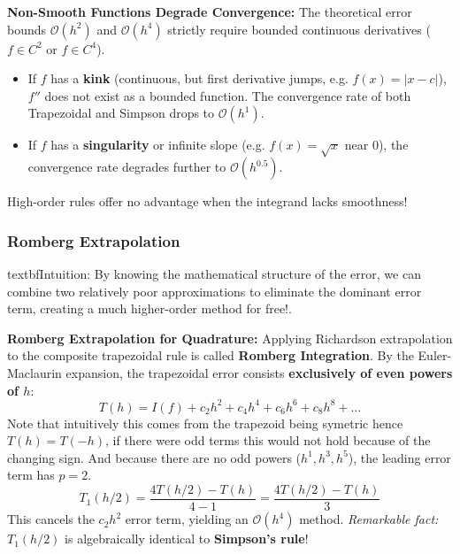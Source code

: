 \begin{remark}
    \textbf{Non-Smooth Functions Degrade Convergence:} The theoretical error bounds $\mathcal{O}(h^2)$ and $\mathcal{O}(h^4)$ strictly require bounded continuous derivatives ($f \in C^2$ or $f \in C^4$).
    \begin{itemize}
        \item If $f$ has a \textbf{kink} (continuous, but first derivative jumps, e.g. $f(x) = |x - c|$), $f''$ does not exist as a bounded function. The convergence rate of both Trapezoidal and Simpson drops to $\mathcal{O}(h^1)$.
        \item If $f$ has a \textbf{singularity} or infinite slope (e.g. $f(x) = \sqrt{x}$ near 0), the convergence rate degrades further to $\mathcal{O}(h^{0.5})$.
    \end{itemize}
    High-order rules offer no advantage when the integrand lacks smoothness!
\end{remark}


\subsubsection{Romberg Extrapolation}

\begin{remark}
    textbf{Intuition:} By knowing the mathematical structure of the error, we can combine two relatively poor approximations to eliminate the dominant error term, creating a much higher-order method for free!.
\end{remark}

\begin{definition}
    \textbf{Romberg Extrapolation for Quadrature:} Applying Richardson extrapolation to the composite trapezoidal rule is called \textbf{Romberg Integration}.
    By the Euler-Maclaurin expansion, the trapezoidal error consists \textbf{exclusively of even powers of $h$}:
    $$T(h) = I(f) + c_2 h^2 + c_4 h^4 + c_6 h^6 + c_8 h^8 + \dots$$
    Note that intuitively this comes from the trapezoid being symetric hence $T(h) = T(-h)$, if there were odd terms this would not hold because of the changing sign.
    And because there are no odd powers ($h^1, h^3, h^5$), the leading error term has $p = 2$.
    $$T_1(h/2) = \frac{4 T(h/2) - T(h)}{4 - 1} = \frac{4 T(h/2) - T(h)}{3}$$
    This cancels the $c_2 h^2$ error term, yielding an $\mathcal{O}(h^4)$ method.
    \emph{Remarkable fact:} $T_1(h/2)$ is algebraically identical to \textbf{Simpson's rule}!
\end{definition}

